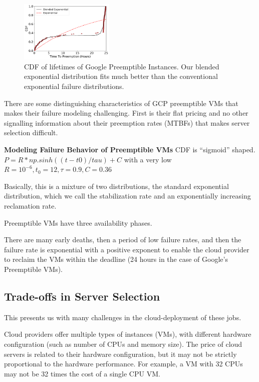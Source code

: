 \begin{figure}
  \centering
  \includegraphics[width=0.4\textwidth]{../data/cdf_all.pdf}
  \caption{CDF of lifetimes of Google Preemptible Instances. Our blended exponential distribution fits much better than the conventional exponential failure distributions. }
  \label{fig:gcp1}
\end{figure}

There are some distinguishing characteristics of GCP preemptible VMs that makes their failure modeling challenging.
First is their flat pricing and no other signalling information about their preemption rates (MTBFs) that makes server selection difficult.

\textbf{Modeling Failure Behavior of Preemptible VMs}
CDF is ``sigmoid'' shaped.
$P=R*np.sinh((t-t0)/tau) + C$ with a very low $R=10^{-6}, t_0=12, \tau=0.9, C=0.36$

Basically, this is a mixture of two distributions, the standard exponential distribution, which we call the stabilization rate and an exponentially increasing reclamation rate.

Preemptible VMs have three availability phases.

There are many early deaths, then a period of low failure rates, and then the failure rate is exponential with a positive exponent to enable the cloud provider to reclaim the VMs within the deadline (24 hours in the case of Google's Preemptible VMs).



\subsection{Trade-offs in Server Selection}

This presents us with many challenges in the cloud-deployment of these jobs.

Cloud providers offer multiple types of instances (VMs), with different hardware configuration (such as number of CPUs and memory size).
The price of cloud servers is related to their hardware configuration, but it may not be strictly proportional to the hardware performance.
For example, a VM with 32 CPUs may not be 32 times the cost of a single CPU VM.


